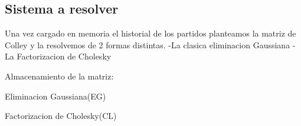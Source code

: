 \subsection{Sistema a resolver}

Una vez cargado en memoria el historial de los partidos planteamos la matriz de Colley y la 
resolvemos de 2 formas distintas.
-La clasica eliminacion Gaussiana 
-La Factorizacion de Cholesky
 
Almacenamiento de la matriz:

Eliminacion Gaussiana(EG)

Factorizacion de Cholesky(CL)